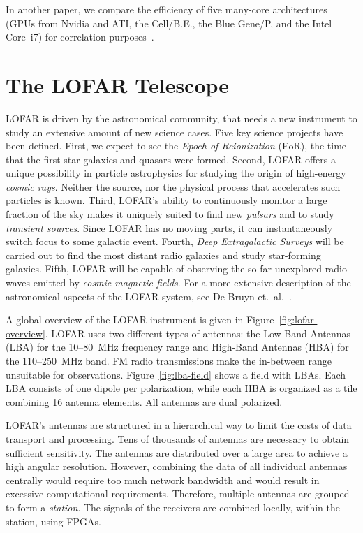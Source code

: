 \documentclass{sig-alternate}
\begin{document}
In another paper, we compare the efficiency of five many-core
architectures (GPUs from Nvidia and ATI, the Cell/B.E., the Blue Gene/P,
and the Intel Core~i7) for correlation purposes~\cite{Nieuwpoort:09}.



\section{The LOFAR Telescope}
\label{sec:overview}

LOFAR is driven by the astronomical community, that needs a new instrument
to study an extensive amount of new science cases.
Five key science projects have been defined.
First, we expect to see the \emph{Epoch of Reionization\/} (EoR), the time
that the first star galaxies and quasars were formed.
Second, LOFAR offers a unique possibility in particle astrophysics for
studying the origin of high-energy
\emph{cosmic rays}.
Neither the source, nor the physical process that accelerates such particles
is known.
Third, LOFAR's ability to continuously monitor a large fraction of the sky
makes it uniquely suited to find new \emph{pulsars} and to study \emph{transient sources}.
Since LOFAR has no moving parts, it can instantaneously switch focus to
some galactic event.
Fourth, \emph{Deep Extragalactic Surveys\/} will be carried out to find the
most distant radio galaxies and study star-forming galaxies.
Fifth, LOFAR will be capable of observing the so far unexplored radio
waves emitted by \emph{cosmic magnetic fields}.
For a more extensive description of the astronomical aspects of the LOFAR
system, see De Bruyn et.~al.~\cite{Bruyn:02}.

A global overview of the LOFAR instrument is given in
Figure~\ref{fig:lofar-overview}. LOFAR uses two different types of
antennas: the Low-Band Antennas (LBA) for the 10--80~MHz frequency
range and High-Band Antennas (HBA) for the 110--250~MHz band.
FM radio transmissions make the in-between range unsuitable for observations.
Figure~\ref{fig:lba-field} shows a field with LBAs. Each
LBA consists of one dipole per polarization, while each HBA is
organized as a tile combining 16 antenna elements. All
antennas are dual polarized.

LOFAR's antennas are structured in a hierarchical way to limit the
costs of data transport and processing. Tens of thousands of antennas are
necessary to obtain sufficient sensitivity. The antennas are
distributed over a large area to achieve a high angular resolution.
However, combining the data of all individual antennas centrally would
require too much network bandwidth and would result in excessive
computational requirements. Therefore, multiple antennas are grouped
to form a \emph{station}.
The signals of the receivers are combined locally, within the station, using FPGAs.
\end{document}

